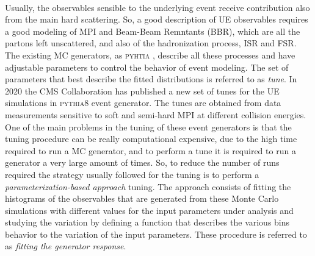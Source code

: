 \\
Usually, the observables sensible to the underlying event receive contribution also from the main hard scattering. So, a good  description of UE observables requires a good modeling of MPI and Beam-Beam Remntants (BBR), which are all the partons left unscattered, and also of the hadronization process, ISR and FSR. The existing MC generators, as \textsc{pyhtia} \cite{PYTHIA2015}, describe all these processes and have adjustable parameters to control the behavior of event modeling. The set of parameters that best describe the fitted distributions is referred to as \textit{tune}. 
In 2020 the CMS Collaboration has published a new set of tunes for the UE simulations \cite{CPtunes} in \textsc{pythia8} event generator. The tunes are obtained from data measurements sensitive to soft and semi-hard MPI at different collision energies. 
\\
One of the main problems in the tuning of these event generators is that the tuning procedure can be really computational expensive, due to the high time required to run a MC generator, and to perform a tune it is required to run a generator a very large amount of times. So, to reduce the number of runs required the strategy usually followed for the tuning is to perform a \textit{parameterization-based approach} tuning. The approach consists of fitting the histograms of the observables that are generated from these Monte Carlo simulations with different values for the input parameters under analysis and studying the variation by defining a function that describes the various bins behavior to the variation of the input parameters. These procedure is referred to as  \textit{fitting the generator response}.

\medskip

